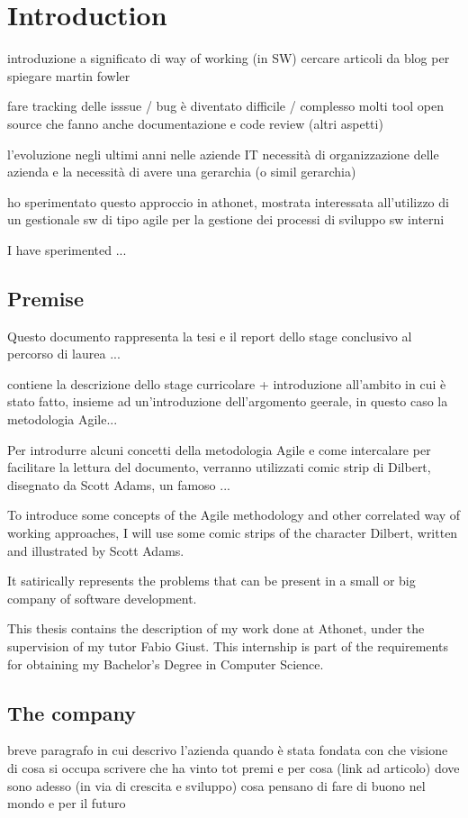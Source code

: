 \chapter{Introduction}
\label{introduction}

introduzione a significato di way of working (in SW)
	cercare articoli da blog per spiegare
	martin fowler		

fare tracking delle isssue / bug è diventato difficile / complesso
	molti tool open source che fanno anche documentazione e code review (altri aspetti)

l'evoluzione negli ultimi anni nelle aziende IT
	necessità di organizzazione delle azienda e la necessità di avere una gerarchia (o simil gerarchia)

ho sperimentato questo approccio in athonet, mostrata interessata all'utilizzo di un gestionale sw di tipo agile per la gestione dei processi di sviluppo sw interni

I have sperimented ... 

\section{Premise}

	Questo documento rappresenta la tesi e il report dello stage conclusivo al percorso di laurea ...
	
	contiene la descrizione dello stage curricolare + introduzione all'ambito in cui è stato fatto, insieme ad un'introduzione dell'argomento geerale, in questo caso la metodologia Agile...

	Per introdurre alcuni concetti della metodologia Agile e come intercalare per facilitare la lettura del documento, verranno utilizzati comic strip di Dilbert, disegnato da Scott Adams, un famoso ...
	
	To introduce some concepts of the Agile methodology and other correlated way of working approaches, I will use some comic strips of the character Dilbert, written and illustrated by Scott Adams.
	
	It satirically represents the problems that can be present in a small or big company of software development.
	
	This thesis contains the description of my work done at Athonet, under the supervision of my tutor Fabio Giust.
	This internship is part of the requirements for obtaining my Bachelor's Degree in Computer Science.
	
\section{The company}
	breve paragrafo in cui descrivo l'azienda
	quando è stata fondata
	con che visione
	di cosa si occupa
	scrivere che ha vinto tot premi e per cosa (link ad articolo)
	dove sono adesso (in via di crescita e sviluppo)
	cosa pensano di fare di buono nel mondo e per il futuro
	
